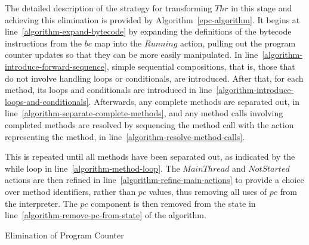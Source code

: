 The detailed description of the strategy for transforming $Thr$ in
this stage and achieving this elimination is provided by
Algorithm~\ref{epc-algorithm}.
It begins at line~\ref{algorithm-expand-bytecode} by expanding the
\Circus{} definitions of the bytecode instructions from the $bc$ map
into the $Running$ action, pulling out the program counter updates so
that they can be more easily manipulated.
In line~\ref{algorithm-introduce-forward-sequence}, simple sequential
compositions, that is, those that do not involve handling loops or
conditionals, are introduced.
After that, for each method, its loops and conditionals are introduced
in line~\ref{algorithm-introduce-loops-and-conditionals}. 
Afterwards, any complete methods are separated out, in
line~\ref{algorithm-separate-complete-methods}, and any method calls
involving completed methods are resolved by sequencing the method call
with the \Circus{} action representing the method, in
line~\ref{algorithm-resolve-method-calls}.

This is repeated until all methods have been separated out, as
indicated by the while loop in line~\ref{algorithm-method-loop}.
The $MainThread$ and $NotStarted$ actions are then refined in
line~\ref{algorithm-refine-main-actions} to provide a choice over
method identifiers, rather than $pc$ values, thus removing all uses of
$pc$ from the interpreter.
The $pc$ component is then removed from the state in
line~\ref{algorithm-remove-pc-from-state} of the algorithm.

\begin{algorithm}[t]
  \begin{algorithmic}[1]
    \State {} \label{algorithm-expand-bytecode}
    \State {} \label{algorithm-introduce-forward-sequence}
     \label{algorithm-method-loop}
    \State {} \label{algorithm-introduce-loops-and-conditionals}
    \State {} \label{algorithm-separate-complete-methods}
    \State {} \label{algorithm-resolve-method-calls}
    \EndWhile
    \State {} \label{algorithm-refine-main-actions}
    \State {} \label{algorithm-remove-pc-from-state}
  \end{algorithmic}
  \caption{Elimination of Program Counter}
  \label{epc-algorithm}
\end{algorithm}

